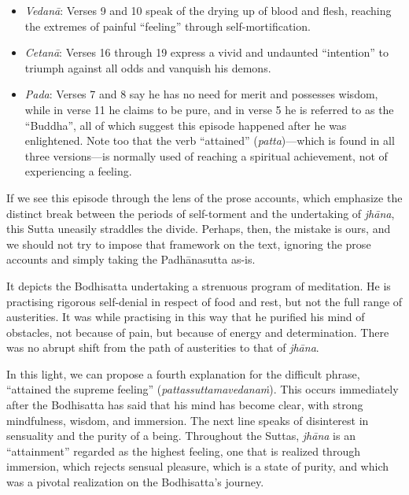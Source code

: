 \documentclass[12pt,openany]{book}%
\begin{document}
\begin{itemize}%
\item \textit{\textsanskrit{Vedanā}}: Verses 9 and 10 speak of the drying up of blood and flesh, reaching the extremes of painful “feeling” through self-mortification.%
\item \textit{\textsanskrit{Cetanā}}: Verses 16 through 19 express a vivid and undaunted “intention” to triumph against all odds and vanquish his demons.%
\item \textit{Pada}: Verses 7 and 8 say he has no need for merit and possesses wisdom, while in verse 11 he claims to be pure, and in verse 5 he is referred to as the “Buddha”, all of which suggest this episode happened after he was enlightened. Note too that the verb “attained” (\textit{patta})—which is found in all three versions—is normally used of reaching a spiritual achievement, not of experiencing a feeling.%
\end{itemize}

If we see this episode through the lens of the prose accounts, which emphasize the distinct break between the periods of self-torment and the undertaking of \textit{\textsanskrit{jhāna}}, this Sutta uneasily straddles the divide. Perhaps, then, the mistake is ours, and we should not try to impose that framework on the text, ignoring the prose accounts and simply taking the \textsanskrit{Padhānasutta} as-is.

It depicts the Bodhisatta undertaking a strenuous program of meditation. He is practising rigorous self-denial in respect of food and rest, but not the full range of austerities. It was while practising in this way that he purified his mind of obstacles, not because of pain, but because of energy and determination. There was no abrupt shift from the path of austerities to that of \textit{\textsanskrit{jhāna}}.

In this light, we can propose a fourth explanation for the difficult phrase, “attained the supreme feeling” (\textit{\textsanskrit{pattassuttamavedanaṁ}}). This occurs immediately after the Bodhisatta has said that his mind has become clear, with strong mindfulness, wisdom, and immersion. The next line speaks of disinterest in sensuality and the purity of a being. Throughout the Suttas, \textit{\textsanskrit{jhāna}} is an “attainment” regarded as the highest feeling, one that is realized through immersion, which rejects sensual pleasure, which is a state of purity, and which was a pivotal realization on the Bodhisatta’s journey.
\end{document}
